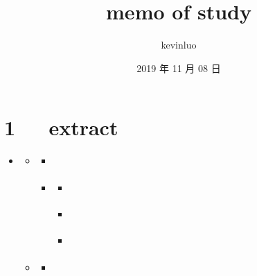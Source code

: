 \documentclass[letterpaper,12pt,english]{sphinxmanual}
\title{memo of study}
\date{2019 年 11 月 08 日}
\author{kevinluo}
\begin{document}
\pagestyle{empty}
\sphinxmaketitle
\pagestyle{plain}
\sphinxtableofcontents
\pagestyle{normal}
\label{\detokenize{index::doc}}



\chapter{1   extract}
\label{\detokenize{000misc/extract:extract}}\label{\detokenize{000misc/extract::doc}}
\begin{sphinxShadowBox}
\begin{itemize}
\item {} 
\label{\detokenize{000misc/extract:id8}}{\hyperref[\detokenize{000misc/extract:extract}]{}}
\begin{itemize}
\item {} 
\label{\detokenize{000misc/extract:id9}}{\hyperref[\detokenize{000misc/extract:id2}]{}}
\begin{itemize}
\item {} 
\label{\detokenize{000misc/extract:id10}}{\hyperref[\detokenize{000misc/extract:id3}]{}}

\item {} 
\label{\detokenize{000misc/extract:id11}}{\hyperref[\detokenize{000misc/extract:c4d-3dmax-maya}]{}}
\begin{itemize}
\item {} 
\label{\detokenize{000misc/extract:id12}}{\hyperref[\detokenize{000misc/extract:dmax-c4d}]{}}

\item {} 
\label{\detokenize{000misc/extract:id13}}{\hyperref[\detokenize{000misc/extract:dmaxmayac4d}]{}}

\item {} 
\label{\detokenize{000misc/extract:id14}}{\hyperref[\detokenize{000misc/extract:c4d-c4d}]{}}

\end{itemize}

\end{itemize}

\item {} 
\label{\detokenize{000misc/extract:id15}}{\hyperref[\detokenize{000misc/extract:id4}]{}}
\begin{itemize}
\item {} 
\label{\detokenize{000misc/extract:id16}}{\hyperref[\detokenize{000misc/extract:graphviz}]{}}


\end{itemize}
\end{itemize}
\end{itemize}
\end{sphinxShadowBox}
\end{document}
